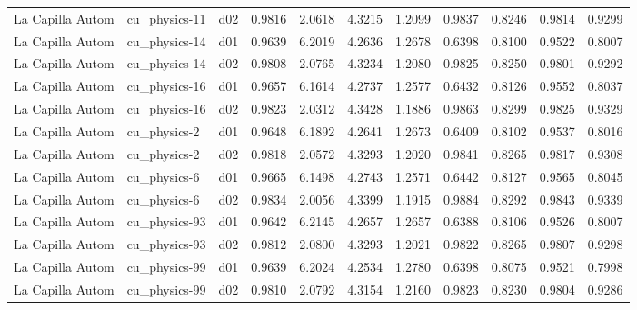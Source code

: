\begin{longtable}{lllrrrrrrrr}
     La Capilla Autom  &         cu\_physics-11 &     d02 &   0.9816 &   2.0618 &   4.3215 &       1.2099 &        0.9837 &       0.8246 &           0.9814 &  0.9299 \\
     La Capilla Autom  &         cu\_physics-14 &     d01 &   0.9639 &   6.2019 &   4.2636 &       1.2678 &        0.6398 &       0.8100 &           0.9522 &  0.8007 \\
     La Capilla Autom  &         cu\_physics-14 &     d02 &   0.9808 &   2.0765 &   4.3234 &       1.2080 &        0.9825 &       0.8250 &           0.9801 &  0.9292 \\
     La Capilla Autom  &         cu\_physics-16 &     d01 &   0.9657 &   6.1614 &   4.2737 &       1.2577 &        0.6432 &       0.8126 &           0.9552 &  0.8037 \\
     La Capilla Autom  &         cu\_physics-16 &     d02 &   0.9823 &   2.0312 &   4.3428 &       1.1886 &        0.9863 &       0.8299 &           0.9825 &  0.9329 \\
     La Capilla Autom  &          cu\_physics-2 &     d01 &   0.9648 &   6.1892 &   4.2641 &       1.2673 &        0.6409 &       0.8102 &           0.9537 &  0.8016 \\
     La Capilla Autom  &          cu\_physics-2 &     d02 &   0.9818 &   2.0572 &   4.3293 &       1.2020 &        0.9841 &       0.8265 &           0.9817 &  0.9308 \\
     La Capilla Autom  &          cu\_physics-6 &     d01 &   0.9665 &   6.1498 &   4.2743 &       1.2571 &        0.6442 &       0.8127 &           0.9565 &  0.8045 \\
     La Capilla Autom  &          cu\_physics-6 &     d02 &   0.9834 &   2.0056 &   4.3399 &       1.1915 &        0.9884 &       0.8292 &           0.9843 &  0.9339 \\
     La Capilla Autom  &         cu\_physics-93 &     d01 &   0.9642 &   6.2145 &   4.2657 &       1.2657 &        0.6388 &       0.8106 &           0.9526 &  0.8007 \\
     La Capilla Autom  &         cu\_physics-93 &     d02 &   0.9812 &   2.0800 &   4.3293 &       1.2021 &        0.9822 &       0.8265 &           0.9807 &  0.9298 \\
     La Capilla Autom  &         cu\_physics-99 &     d01 &   0.9639 &   6.2024 &   4.2534 &       1.2780 &        0.6398 &       0.8075 &           0.9521 &  0.7998 \\
     La Capilla Autom  &         cu\_physics-99 &     d02 &   0.9810 &   2.0792 &   4.3154 &       1.2160 &        0.9823 &       0.8230 &           0.9804 &  0.9286 \\

\end{longtable}
